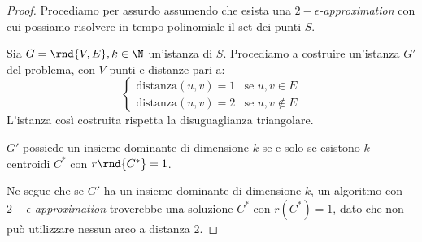 \documentclass[\main/main.tex]{subfiles}
\begin{document}
\begin{proof}
	Procediamo per assurdo assumendo che esista una \textit{\(2-\epsilon\)-approximation} con cui possiamo risolvere in tempo polinomiale il set dei punti \(S\).

	Sia \(G = \rnd{V, E}, k \in \N \) un'istanza di \(S\). Procediamo a costruire un'istanza \(G'\) del problema, con \(V\) punti e distanze pari a:
	\[
		\begin{cases}
			\text{distanza}(u,v) = 1 & \text{se \(u, v \in E\)}     \\
			\text{distanza}(u,v) = 2 & \text{se \(u, v \not\in E\)}
		\end{cases}
	\]
	L'istanza così costruita rispetta la disuguaglianza triangolare.

	\(G'\) possiede un insieme dominante di dimensione \(k\) se e solo se esistono \(k\) centroidi \(C^*\) con \(r\rnd{C^*} = 1\).

	Ne segue che se \(G'\) ha un insieme dominante di dimensione \(k\), un algoritmo con \textit{\(2-\epsilon\)-approximation} troverebbe una soluzione \(C^*\) con \(r(C^*) = 1\), dato che non può utilizzare nessun arco a distanza \(2\).
\end{proof}
\end{document}
